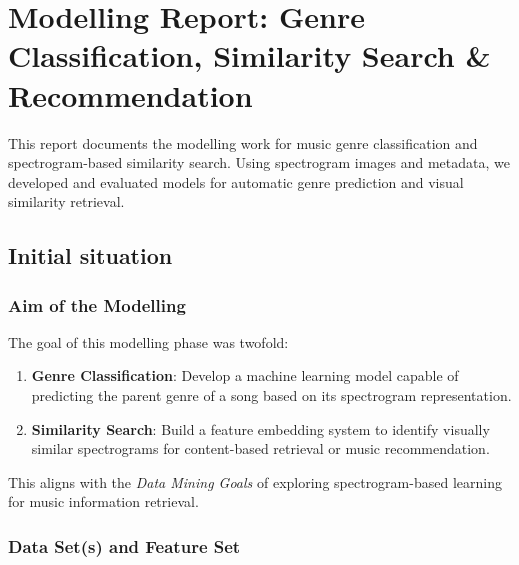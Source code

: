 \documentclass[
  letterpaper,
  DIV=11,
  numbers=noendperiod]{scrreprt}
\author{}
\date{}
\providecommand{\tightlist}{%
  \setlength{\itemsep}{0pt}\setlength{\parskip}{0pt}}
\begin{document}
\chapter{Modelling Report: Genre Classification, Similarity Search \&
Recommendation}\label{modelling-report-genre-classification-similarity-search-recommendation}

This report documents the modelling work for music genre classification
and spectrogram-based similarity search. Using spectrogram images and
metadata, we developed and evaluated models for automatic genre
prediction and visual similarity retrieval.

\section{Initial situation}\label{initial-situation}

\subsection{Aim of the Modelling}\label{aim-of-the-modelling}

The goal of this modelling phase was twofold:

\begin{enumerate}
\def\labelenumi{\arabic{enumi}.}
\tightlist
\item
  \textbf{Genre Classification}: Develop a machine learning model
  capable of predicting the parent genre of a song based on its
  spectrogram representation.
\item
  \textbf{Similarity Search}: Build a feature embedding system to
  identify visually similar spectrograms for content-based retrieval or
  music recommendation.
\end{enumerate}

This aligns with the \emph{Data Mining Goals} of exploring
spectrogram-based learning for music information retrieval.

\subsection{Data Set(s) and Feature
Set}\label{data-sets-and-feature-set}
\end{document}
